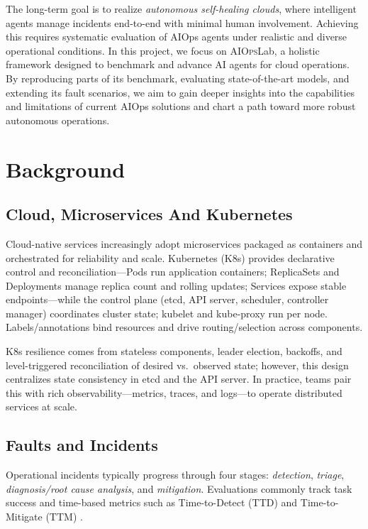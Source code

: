 \documentclass[conference]{IEEEtran}
\begin{document}
The long-term goal is to realize \textit{autonomous self-healing clouds}, where intelligent agents manage incidents end-to-end with minimal human involvement. Achieving this requires systematic evaluation of AIOps agents under realistic and diverse operational conditions. In this project, we focus on \textsc{AIOps}Lab, a holistic framework designed to benchmark and advance AI agents for cloud operations. By reproducing parts of its benchmark, evaluating state-of-the-art models, and extending its fault scenarios, we aim to gain deeper insights into the capabilities and limitations of current AIOps solutions and chart a path toward more robust autonomous operations.

\section{Background}

\subsection{Cloud, Microservices And Kubernetes}
Cloud-native services increasingly adopt microservices packaged as containers and orchestrated for reliability and scale. Kubernetes (K8s) provides declarative control and reconciliation—Pods run application containers; ReplicaSets and Deployments manage replica count and rolling updates; Services expose stable endpoints—while the control plane (etcd, API server, scheduler, controller manager) coordinates cluster state; kubelet and kube-proxy run per node. Labels/annotations bind resources and drive routing/selection across components. 

K8s resilience comes from stateless components, leader election, backoffs, and level-triggered reconciliation of desired vs.\ observed state; however, this design centralizes state consistency in etcd and the API server. In practice, teams pair this with rich observability—metrics, traces, and logs—to operate distributed services at scale.

\subsection{Faults and Incidents}
Operational incidents typically progress through four stages: \emph{detection}, \emph{triage}, \emph{diagnosis/root cause analysis}, and \emph{mitigation}. Evaluations commonly track task success and time-based metrics such as Time-to-Detect (TTD) and Time-to-Mitigate (TTM) \cite{chen2025aiopslab}. 
\end{document}
